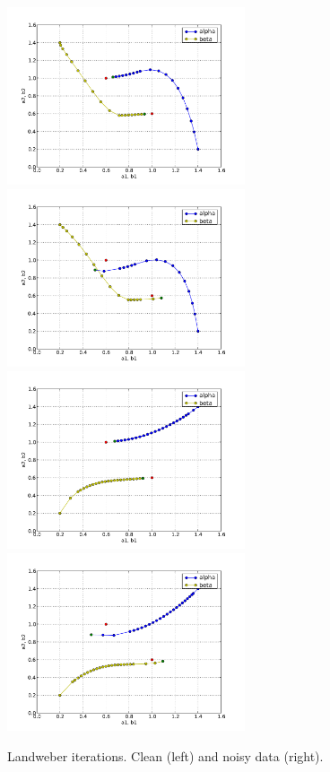\begin{figure}
\begin{center}
    \includegraphics[width=7cm]{chapters/schroll/pdf/4Dscan3b.pdf}
    \includegraphics[width=7cm]{chapters/schroll/pdf/4Dscan3b-5.pdf}
    \includegraphics[width=7cm]{chapters/schroll/pdf/4Dscan4b.pdf}
    \includegraphics[width=7cm]{chapters/schroll/pdf/4Dscan4b-5.pdf}
    \end{center}
    \vspace{-0.7cm}
  \caption{Landweber iterations. Clean (left) and noisy data (right). \label{fig4}}
\end{figure}

